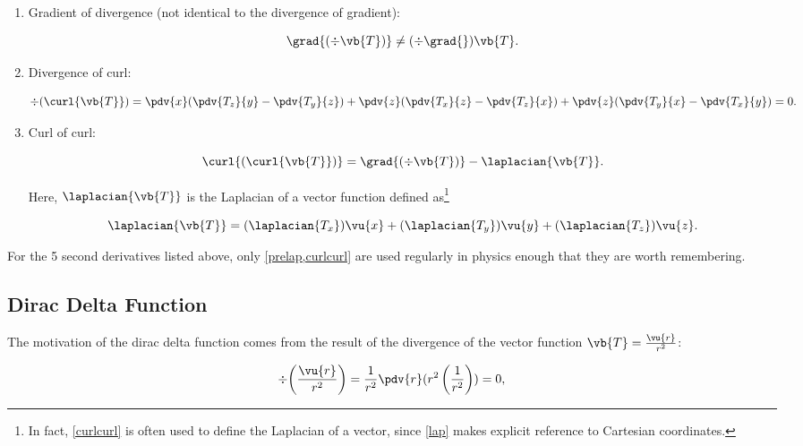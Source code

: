 \documentclass[english,a4paper,12pt]{report}
\begin{document}
\begin{enumerate}
	\item Gradient of divergence (not identical to the divergence of gradient):
		
	\begin{equation} 
		\grad{(\div{\vb{T}})} \neq (\div{\grad{} } )\vb{T}. 
	\end{equation}
		
	\item Divergence of curl:
		
	\begin{equation} 
		\div{(\curl{\vb{T}})} = \pdv{x}(\pdv{T_z}{y} - \pdv{T_y}{z}) + \pdv{z}(\pdv{T_x}{z} - \pdv{T_z}{x}) + \pdv{z}(\pdv{T_y}{x} - \pdv{T_x}{y}) = 0. \label{divcurl} 
	\end{equation}
		
	\item Curl of curl:
		
	\begin{equation} 
		\curl{(\curl{\vb{T}})} = \grad{(\div{\vb{T}})} - \laplacian{\vb{T}}. \label{curlcurl} 
	\end{equation} 
		
	Here, \(\laplacian{\vb{T}}\) is the Laplacian of a vector function defined as\footnote{In fact, \cref{curlcurl} is often used to define the Laplacian of a vector, since \cref{lap} makes explicit reference to Cartesian coordinates.}
		
	\begin{equation} 
		\laplacian{\vb{T}} = (\laplacian{T_x})\vu{x} + (\laplacian{T_y})\vu{y} + (\laplacian{T_z})\vu{z}. 
	\end{equation}	
\end{enumerate}	
	
For the 5 second derivatives listed above, only \cref{prelap,curlcurl} are used regularly in physics enough that they are worth remembering.
	
\subsection{Dirac Delta Function}
	
The motivation of the dirac delta function comes from the result of the divergence of the vector function \(\vb{T} = \frac{\vu{r}}{r^2}\):
	
\begin{equation} 
	\div{\left(\frac{\vu{r}}{r^2}\right)} = \frac{1}{r^2} \pdv{r}(r^2\left(\frac{1}{r^2}\right)) = 0, \label{notmatchone} 
\end{equation}
	
\end{document}
